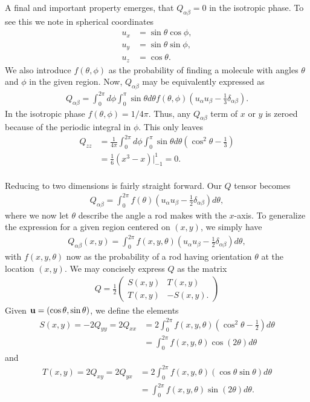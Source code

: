 A final and important property emerges, that $Q_{\alpha\beta} = 0$ in the isotropic phase. To see this we note in spherical coordinates
\begin{align*}
	u_x &= \sin\theta\cos\phi,\\
	u_y &= \sin\theta\sin\phi,\\
	u_z &= \cos\theta.
\end{align*}
We also introduce $f(\theta,\phi)$ as the probability of finding a molecule with angles $\theta$ and $\phi$ in the given region. Now, $Q_{\alpha\beta}$ may be equivalently expressed as
\begin{align*}
	Q_{\alpha\beta} = \int_0^{2\pi}d\phi \int_0^\pi \sin\theta d\theta f(\theta,\phi)\left( u_\alpha u_\beta - \frac{1}{3}\delta_{\alpha\beta}\right).
\end{align*}
In the isotropic phase $f(\theta,\phi) = 1/4\pi$. Thus, any $Q_{\alpha\beta}$ term of $x$ or $y$ is zeroed because of the periodic integral in $\phi$. This only leaves
\begin{align*}
	Q_{zz} &= \frac{1}{4\pi}\int_0^{2\pi}d\phi
	\int_0^\pi \sin\theta d\theta\left(\cos^2\theta - \frac{1}{3}\right)\\
	&= \frac{1}{6}\left(x^3 - x\right)\Big|_{-1}^1 = 0.\\
\end{align*}

Reducing to two dimensions is fairly straight forward. Our $Q$ tensor becomes
\begin{align}
	Q_{\alpha\beta} = \int_0^{2\pi}f(\theta)\left( 
	u_{\alpha}u_\beta - \frac{1}{2}\delta_{\alpha\beta} \right) d\theta,
\end{align}
where we now let $\theta$ describe the angle a rod makes with the $x$-axis. To generalize the expression for a given region centered on $(x,y)$, we simply have
\begin{align}
Q_{\alpha\beta}(x,y) = \int_0^{2\pi}f(x,y,\theta)\left( 
u_{\alpha}u_\beta - \frac{1}{2}\delta_{\alpha\beta} \right) d\theta,
\end{align}
with $f(x,y,\theta)$ now as the probability of a rod having orientation $\theta$ at the location $(x,y)$. We may concisely express $Q$ as the matrix
\begin{align}
	Q = \frac{1}{2}\left(
	\begin{matrix}
	S(x,y) & T(x,y)\\
	T(x,y) & -S(x,y).
	\end{matrix}
	\right)
\label{eq:Qmat}
\end{align}
Given $\mathbf{u} = (\cos\theta,\sin\theta)$, we define the elements
\begin{align}
	\nonumber
	S(x,y) = -2Q_{yy} = 2Q_{xx} &= 2\int_0^{2\pi} f(x,y,\theta)\left( \cos^2\theta - \frac{1}{2}\right) d\theta\\
	&= \int_0^{2\pi}
	f(x,y,\theta)\cos(2\theta)d\theta
\end{align}
and
\begin{align}
	\nonumber
	T(x,y) = 2Q_{xy} = 2Q_{yx} &= 2\int_0^{2\pi} f(x,y,\theta)\left( \cos\theta\sin\theta \right) d\theta\\
	&= \int_0^{2\pi}
	f(x,y,\theta)\sin(2\theta) d\theta.
\end{align}

